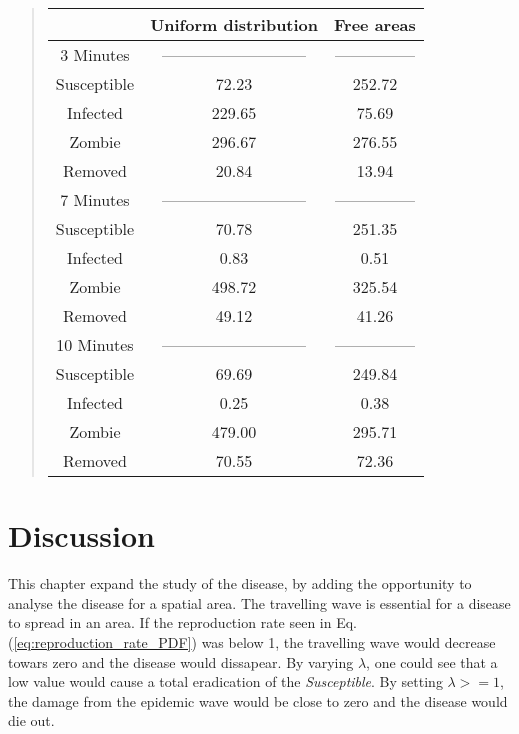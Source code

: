 \documentclass[%
twoside,                 %
final,                   %
chapterprefix=true,      %
open=right               %
10pt]{book}
\begin{document}
\begin{quote}
\begin{tabular}{ccc}
\hline
\multicolumn{1}{c}{  } & \multicolumn{1}{c}{ Uniform distribution } & \multicolumn{1}{c}{ Free areas } \\
\hline
3 Minutes   & --------------------------- & --------------- \\
\hline
Susceptible & 72.23                       & 252.72          \\
Infected    & 229.65                      & 75.69           \\
Zombie      & 296.67                      & 276.55          \\
Removed     & 20.84                       & 13.94           \\
\hline
7 Minutes   & --------------------------- & --------------- \\
\hline
Susceptible & 70.78                       & 251.35          \\
Infected    & 0.83                        & 0.51            \\
Zombie      & 498.72                      & 325.54          \\
Removed     & 49.12                       & 41.26           \\
\hline
10 Minutes  & --------------------------- & --------------- \\
\hline
Susceptible & 69.69                       & 249.84          \\
Infected    & 0.25                        & 0.38            \\
Zombie      & 479.00                      & 295.71          \\
Removed     & 70.55                       & 72.36           \\
\hline
\end{tabular}
\end{quote}

\noindent

\section{Discussion}
This chapter expand the study of the disease, by adding the opportunity to analyse the disease for a spatial area. The travelling wave is essential for a disease to spread in an area. If the reproduction rate seen in Eq.(\ref{eq:reproduction_rate_PDF}) was below 1, the travelling wave would decrease towars zero and the disease would dissapear. By varying $\lambda$, one could see that a low value would cause a total eradication of the \emph{Susceptible}. By setting $\lambda>=1$, the damage from the epidemic wave would be close to zero and the disease would die out.
\end{document}
